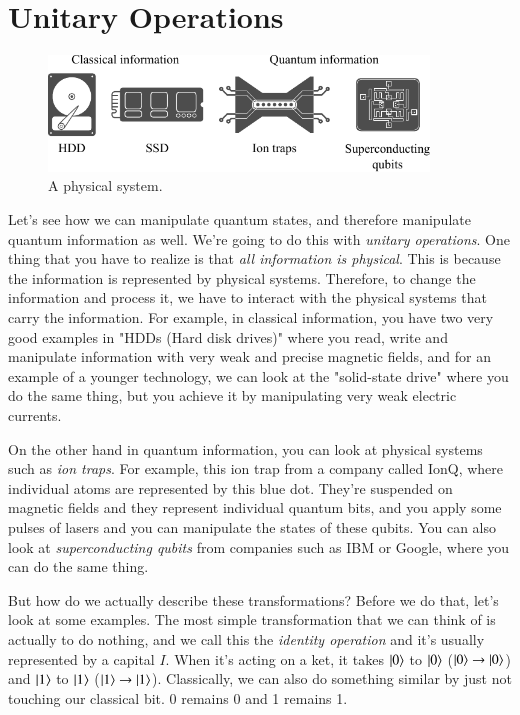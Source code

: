 \section{Unitary Operations}


\begin{figure}[H]
    \centering
    \includegraphics[width=0.9\textwidth]{lesson2/2-2_classical_quantum_info.pdf}
        \caption{A physical system.}
    \label{fig:physical-system}
\end{figure}

Let's see how we can manipulate quantum states, and therefore manipulate quantum information as well. We're going to do this with \emph{unitary operations}. One thing that you have to realize is that \emph{all information is physical}. This is because the information is represented by physical systems. Therefore, to change the information and process it, we have to interact with the physical systems that carry the information. For example, in classical information, you have two very good examples in "HDDs (Hard disk drives)" where you read, write and manipulate information with very weak and precise magnetic fields, and for an example of a younger technology, we can look at the "solid-state drive" where you do the same thing, but you achieve it by manipulating very weak electric currents.

On the other hand in quantum information, you can look at physical systems such as \emph{ion traps}. For example, this ion trap from a company called IonQ, where individual atoms are represented by this blue dot. They're suspended on magnetic fields and they represent individual quantum bits, and you apply some pulses of lasers and you can manipulate the states of these qubits.  You can also look at \emph{superconducting qubits} from companies such as IBM or Google, where you can do the same thing. 

But how do we actually describe these transformations? Before we do that, let's look at some examples. The most simple transformation that we can think of is actually to do nothing, and we call this the \emph{identity operation} and it's usually represented by a capital $I$. When it's acting on a ket, it takes $\left| 0 \right\rangle$ to  $\left| 0 \right\rangle$  ($\left| 0 \right\rangle\rightarrow\left| 0 \right\rangle$) and $\left| 1 \right\rangle$ to $\left| 1 \right\rangle$ ($\left| 1 \right\rangle\rightarrow\left| 1 \right\rangle$). Classically, we can also do something similar by just not touching our classical bit. 0 remains 0 and 1 remains 1.

